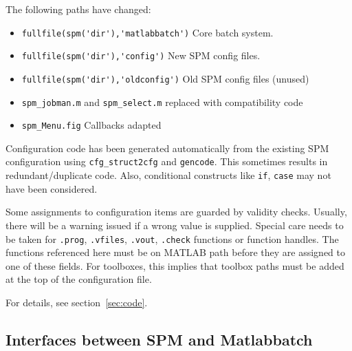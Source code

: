 The following paths have changed:
\begin{itemize}
\item \verb|fullfile(spm('dir'),'matlabbatch')| Core batch system.
\item \verb|fullfile(spm('dir'),'config')| New SPM config files.
\item \verb|fullfile(spm('dir'),'oldconfig')| Old SPM config files (unused)
\item \verb|spm_jobman.m| and \verb|spm_select.m| replaced with compatibility
  code
\item \verb|spm_Menu.fig| Callbacks adapted
\end{itemize}

Configuration code has been generated automatically from the existing SPM
configuration using \verb|cfg_struct2cfg| and \verb|gencode|. This sometimes
results in redundant/duplicate code. Also, conditional constructs like
\verb|if|, \verb|case| may not have been considered. 

Some assignments to configuration items are guarded by validity
checks. Usually, there will be a warning issued if a wrong value is
supplied. Special care needs to be taken for \verb|.prog|, \verb|.vfiles|,
\verb|.vout|, \verb|.check| functions or function handles. The functions
referenced here must be on MATLAB path before they are assigned to one of
these fields. For toolboxes, this implies that toolbox paths must be added at
the top of the configuration file.

For details, see section~\ref{sec:code}. 

\subsection{Interfaces between SPM and Matlabbatch}
\label{sec:overinter}

